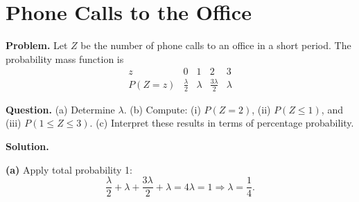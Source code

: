 		\section{Phone Calls to the Office}
		
		\textbf{Problem.}
		Let $Z$ be the number of phone calls to an office in a short period. The probability mass function is
		\[
		\begin{array}{c|cccc}
			z & 0 & 1 & 2 & 3\\
			\hline
			P(Z=z) & \frac{\lambda}{2} & \lambda & \frac{3\lambda}{2} & \lambda
		\end{array}
		\]
		
		\textbf{Question.}
		(a) Determine $\lambda$.
		(b) Compute: (i) $P(Z=2)$, (ii) $P(Z\le 1)$, and (iii) $P(1\le Z\le 3)$.
		(c) Interpret these results in terms of percentage probability.
		
		\textbf{Solution.}

		\textbf{(a)} Apply total probability 1:
		\[
		\frac{\lambda}{2}+\lambda+\frac{3\lambda}{2}+\lambda=4\lambda=1\Rightarrow \lambda=\frac{1}{4}.
		\]

